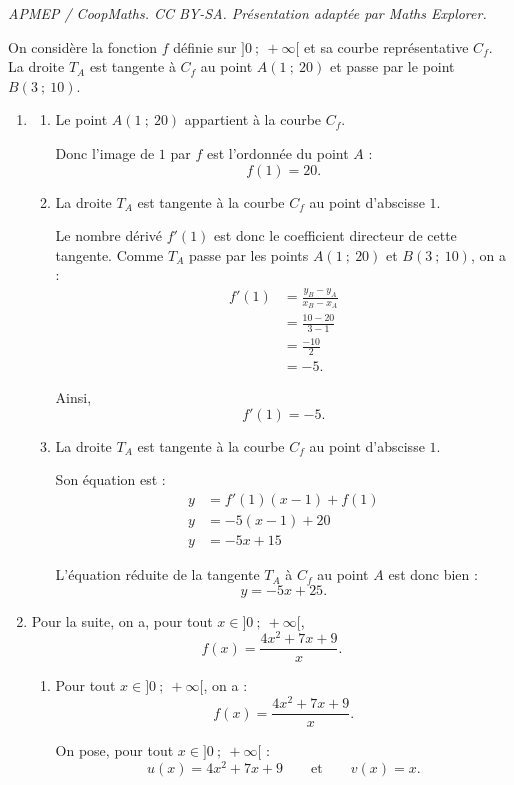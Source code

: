 \documentclass[10pt]{article}
\begin{document}
\noindent\textit{APMEP / CoopMaths. CC BY-SA. Présentation adaptée par Maths Explorer.}\par\medskip
On considère la fonction $f$ définie sur $]0\ ;\ +\infty[$ et sa courbe représentative $C_f$.
La droite $T_A$ est tangente à $C_f$ au point $A(1\ ;\ 20)$ et passe par le point $B(3\ ;\ 10)$.

\begin{enumerate}
\item \begin{enumerate}
\item Le point $A(1\ ;\ 20)$ appartient à la courbe $C_f$.

Donc l'image de $1$ par $f$ est l'ordonnée du point $A$ :
\[
f(1)=20.
\]
\item La droite $T_A$ est tangente à la courbe $C_f$ au point d'abscisse $1$.

Le nombre dérivé $f'(1)$ est donc le coefficient directeur de cette tangente.
Comme $T_A$ passe par les points $A(1\ ;\ 20)$ et $B(3\ ;\ 10)$, on a :
\begin{align*}
	f'(1)&=\frac{y_B-y_A}{x_B-x_A}\\
	&=\frac{10-20}{3-1}\\
	&=\frac{-10}{2}\\
	&=-5.
\end{align*}

Ainsi,
\[
f'(1)=-5.
\]
\item La droite $T_A$ est tangente à la courbe $C_f$ au point d'abscisse $1$.

Son équation est :
\begin{align*}
y&=f'(1)(x-1)+f(1)\\
y&=-5(x-1)+20\\
y&=-5x+15
\end{align*}

L'équation réduite de la tangente $T_A$ à $C_f$ au point $A$ est donc bien :
\[
y=-5x+25.
\]
\end{enumerate}

\item Pour la suite, on a, pour tout $x\in]0\ ;\ +\infty[$,
\[
f(x)=\frac{4x^2+7x+9}{x}.
\]

\begin{enumerate}
\item Pour tout $x\in]0\ ;\ +\infty[$, on a :
$$
f(x)=\frac{4x^2+7x+9}{x}.
$$

On pose, pour tout $x\in]0\ ;\ +\infty[$ :
$$
u(x)=4x^2+7x+9
\qquad \text{et} \qquad
v(x)=x.
$$


\end{enumerate}
\end{enumerate}
\end{document}

